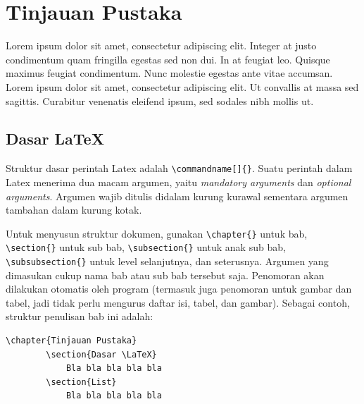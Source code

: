 \chapter{Tinjauan Pustaka}

Lorem ipsum dolor sit amet, consectetur adipiscing elit. Integer at justo condimentum quam fringilla egestas sed non dui. In at feugiat leo. Quisque maximus feugiat condimentum. Nunc molestie egestas ante vitae accumsan. Lorem ipsum dolor sit amet, consectetur adipiscing elit. Ut convallis at massa sed sagittis. Curabitur venenatis eleifend ipsum, sed sodales nibh mollis ut.


\section{Dasar \LaTeX}

Struktur dasar perintah Latex adalah \verb|\commandname[]{}|. Suatu perintah dalam Latex menerima dua macam argumen, yaitu \textit{mandatory arguments} dan \textit{optional arguments}. Argumen wajib ditulis didalam kurung kurawal sementara argumen tambahan dalam kurung kotak. 

Untuk menyusun struktur dokumen, gunakan \verb|\chapter{}| untuk bab, \verb|\section{}| untuk sub bab, \verb|\subsection{}| untuk anak sub bab, \verb|\subsubsection{}| untuk level selanjutnya, dan seterusnya. Argumen yang dimasukan cukup nama bab atau sub bab tersebut saja. Penomoran akan dilakukan otomatis oleh program (termasuk juga penomoran untuk gambar dan tabel, jadi tidak perlu mengurus daftar isi, tabel, dan gambar). Sebagai contoh, struktur penulisan bab ini adalah: 

\begin{lstlisting}[caption={Contoh struktur bab}]
    \chapter{Tinjauan Pustaka}
        \section{Dasar \LaTeX}
            Bla bla bla bla bla
        \section{List}
            Bla bla bla bla bla
\end{lstlisting}

